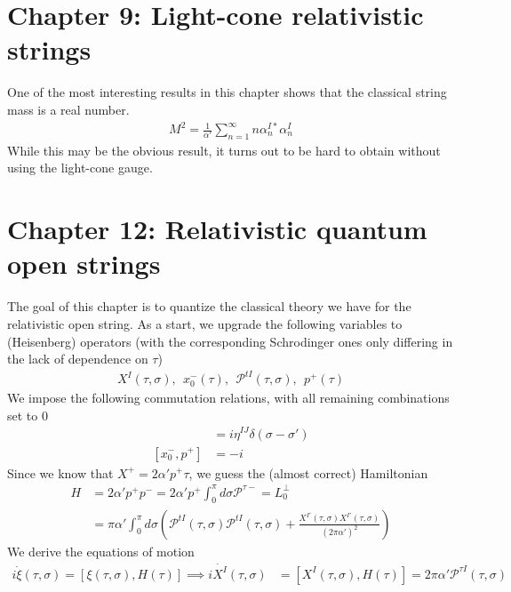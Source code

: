 \documentclass[11pt]{article}
\begin{document}
\newpage 
\section*{Chapter 9: Light-cone relativistic strings}
One of the most interesting results in this chapter shows that the classical string mass is a real number. 
\begin{align*}
    M^2 = \frac{1}{\alpha'} \sum_{n=1}^\infty n \alpha_n^{I*} \alpha_n^I 
\end{align*}
While this may be the obvious result, it turns out to be hard to obtain without using the light-cone gauge. 

\newpage 
\section*{Chapter 12: Relativistic quantum open strings}
The goal of this chapter is to quantize the classical theory we have for the relativistic open string. As a start, we upgrade the following variables to (Heisenberg) operators (with the corresponding Schrodinger ones only differing in the lack of dependence on $\tau$)
\begin{align*}
    X^I(\tau, \sigma), ~~x^-_0(\tau), ~~\mathcal{P}^{tI}(\tau, \sigma), ~~p^+(\tau) \tag{12.5} 
\end{align*}
We impose the following commutation relations, with all remaining combinations set to 0 
\begin{align*}
    [X^I(\sigma), \mathcal{P}^{tJ}(\sigma')] &= i \eta^{IJ} \delta(\sigma - \sigma') \tag{12.6}\\
    [x_0^-, p^+] &= -i \tag{12.8} 
\end{align*} 
Since we know that $X^+ = 2\alpha' p^+ \tau$, we guess the (almost correct) Hamiltonian
\begin{align*}
    H &= 2\alpha' p^+ p^- = 2\alpha' p^+ \int_0^\pi d\sigma \mathcal{P}^{\tau-} = L_0^\perp \tag{12.14, 9.78, 12.16}\\
    &= \pi \alpha' \int_0^\pi d\sigma \left(\mathcal{P}^{tI} (\tau, \sigma) \mathcal{P}^{tI}(\tau, \sigma) + \frac{X^{I'}(\tau, \sigma) X^{I'}(\tau, \sigma)}{(2\pi \alpha')^2}\right) \tag{12.15} 
\end{align*}
We derive the equations of motion 
\begin{align*}
    i \dot{\xi}(\tau, \sigma) = [\xi(\tau, \sigma), H(\tau)] \implies i \dot{X^I}(\tau, \sigma) &= [X^I(\tau, \sigma), H(\tau)]  = 2\pi \alpha' \mathcal{P}^{\tau I}(\tau, \sigma) \tag{12.17, 12.21}
\end{align*}
\end{document}
